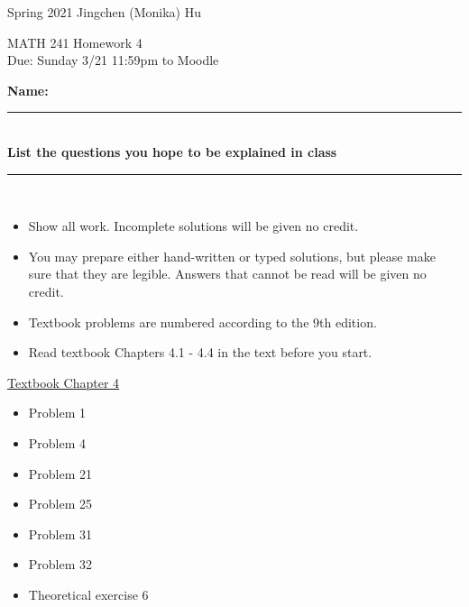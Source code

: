 \documentclass[11pt]{article}
\begin{document}
\enlargethispage{\baselineskip}

Spring 2021 \hfill Jingchen (Monika) Hu\\

\begin{center}
{\huge MATH 241 Homework 4}	\\
Due: Sunday 3/21 11:59pm to Moodle
\end{center}
\vspace{0.5cm}

\textbf{Name:} \rule{6cm}{0.5pt}\\
\textbf{List the questions you hope to be explained in class} \rule{3cm}{0.5pt}	 \\


{\bf
\begin{itemize}
\item Show all work. Incomplete solutions will be given no credit.
\item You may prepare either hand-written or typed solutions, but please make sure that they are legible.
Answers that cannot be read will be given no credit.
\item Textbook problems are numbered according to the 9th edition.
\item Read textbook Chapters 4.1 - 4.4 in the text before you start.

\end{itemize}
}

\underline{Textbook  Chapter 4   }

\begin{itemize}

    \item
    Problem 1
    \item
    Problem 4

    \item
    Problem  21

    \item
    Problem  25

    \item
    Problem  31

    \item
    Problem  32


    \item
    Theoretical exercise 6




\end{itemize}
\end{document}

